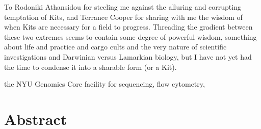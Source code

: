 \documentclass[12pt,letterpaper]{memoir}
\begin{document}
To Rodoniki Athansidou for steeling me against the alluring
and corrupting temptation of Kits, and Terrance Cooper for sharing
with me the wisdom of when Kits are necessary for a field to
progress. Threading the gradient between these two extremes seems to
contain some degree of powerful wisdom, something about life and
practice and cargo cults and the very nature of scientific
investigations and Darwinian versus Lamarkian biology, but I have 
not yet had the time to condense it into a sharable form (or a Kit).


the NYU Genomics Core facility for sequencing, flow cytometry,



\fi

\newpage
\pagestyle{plain}

\section*{Abstract}
\vspace{-0.5em}
\end{document}
